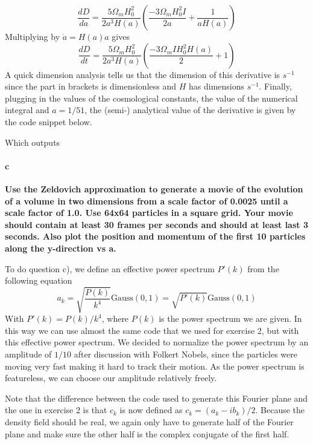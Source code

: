 \begin{equation}
\frac{dD}{da} = \frac{5\Omega_m H_0^2}{2a^3 H(a)} \left( \frac{-3\Omega_m H_0^2 I}{2a} + \frac{1}{a H(a)} \right)
\end{equation}
Multiplying by $\dot{a} = H(a)a$ gives
\begin{equation}
\frac{dD}{dt} = \frac{5\Omega_m H_0^2}{2a^3 H(a)} \left( \frac{-3\Omega_m I H_0^2  H(a)}{2} + 1 \right)
\end{equation}
A quick dimension analysis tells us that the dimension of this derivative is $s^{-1}$ since the part in brackets is dimensionless and $H$ has dimensions $s^{-1}$.
Finally, plugging in the values of the cosmological constants, the value of the numerical integral and $a=1/51$, the (semi-) analytical value of the derivative is given by the code snippet below.



Which outputs


\paragraph{c} \textbf{Use the Zeldovich approximation to generate a movie of the evolution of a volume in two dimensions from a scale factor of 0.0025 until a scale factor of 1.0. Use 64x64 particles in a square grid. Your movie should contain at least 30 frames per seconds and should at least last 3 seconds. Also plot the position and momentum of the first 10 particles along the y-direction vs a.}

To do question c), we define an effective power spectrum $P'(k)$ from the following equation
\begin{equation}
a_k = \sqrt{\frac{P(k)}{k^4}} \mathrm{Gauss}(0,1) = \sqrt{P'(k)} \mathrm{Gauss}(0,1)
\end{equation}
With $P'(k) = P(k)/k^4$, where $P(k)$ is the power spectrum we are given. In this way we can use almost the same code that we used for exercise 2, but with this effective power spectrum. We decided to normalize the power spectrum by an amplitude of $1/10$ after discussion with Folkert Nobels, since the particles were moving very fast making it hard to track their motion. As the power spectrum is featureless, we can choose our amplitude relatively freely. 

Note that the difference between the code used to generate this Fourier plane and the one in exercise 2 is that $c_k$ is now defined as $c_k = (a_k - i b_k)/2$. Because the density field should be real, we again only have to generate half of the Fourier plane and make sure the other half is the complex conjugate of the first half.

